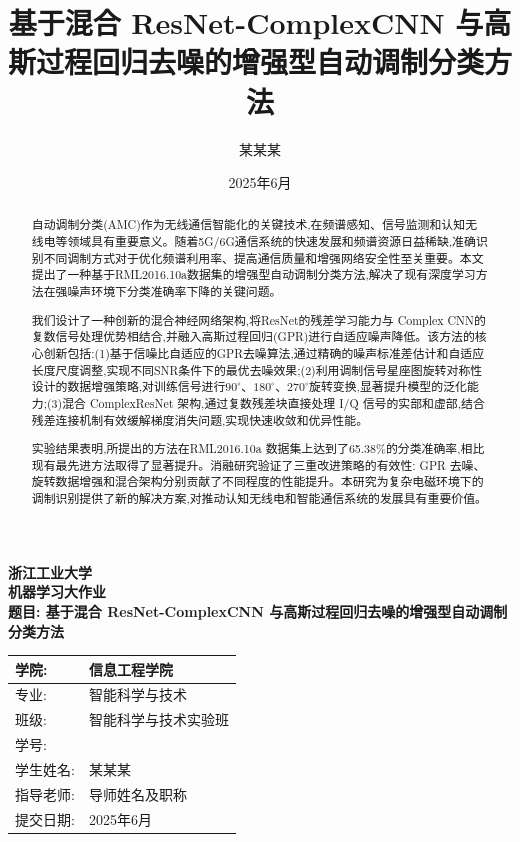 \documentclass{article}
\title{基于混合 ResNet-ComplexCNN 与高斯过程回归去噪的增强型自动调制分类方法}
\author{某某某}
\date{2025年6月}
\begin{document}
\begin{CJK}{UTF8}{gbsn}

\maketitle

\begin{center}
    \textbf{浙江工业大学} \\
    \textbf{机器学习大作业} \\
    \textbf{题目: 基于混合 ResNet-ComplexCNN 与高斯过程回归去噪的增强型自动调制分类方法} \\
    \vspace{0.5cm}
    \begin{tabular}{|l|l|}
        \hline
        学院: & 信息工程学院 \\
        \hline
        专业: & 智能科学与技术 \\
        \hline
        班级: & 智能科学与技术实验班 \\
        \hline
        学号: & \\
        \hline
        学生姓名: & 某某某 \\
        \hline
        指导老师: & 导师姓名及职称 \\
        \hline
        提交日期: & 2025年6月 \\
        \hline
    \end{tabular}
\end{center}

\newpage
\begin{abstract}
自动调制分类(AMC)作为无线通信智能化的关键技术,在频谱感知、信号监测和认知无线电等领域具有重要意义。随着5G/6G通信系统的快速发展和频谱资源日益稀缺,准确识别不同调制方式对于优化频谱利用率、提高通信质量和增强网络安全性至关重要。本文提出了一种基于RML2016.10a数据集的增强型自动调制分类方法,解决了现有深度学习方法在强噪声环境下分类准确率下降的关键问题。

我们设计了一种创新的混合神经网络架构,将ResNet的残差学习能力与 Complex CNN的复数信号处理优势相结合,并融入高斯过程回归(GPR)进行自适应噪声降低。该方法的核心创新包括:(1)基于信噪比自适应的GPR去噪算法,通过精确的噪声标准差估计和自适应长度尺度调整,实现不同SNR条件下的最优去噪效果;(2)利用调制信号星座图旋转对称性设计的数据增强策略,对训练信号进行$90^{\circ}$、$180^{\circ}$、$270^{\circ}$旋转变换,显著提升模型的泛化能力;(3)混合 ComplexResNet 架构,通过复数残差块直接处理 I/Q 信号的实部和虚部,结合残差连接机制有效缓解梯度消失问题,实现快速收敛和优异性能。

实验结果表明,所提出的方法在RML2016.10a 数据集上达到了65.38\%的分类准确率,相比现有最先进方法取得了显著提升。消融研究验证了三重改进策略的有效性: GPR 去噪、旋转数据增强和混合架构分别贡献了不同程度的性能提升。本研究为复杂电磁环境下的调制识别提供了新的解决方案,对推动认知无线电和智能通信系统的发展具有重要价值。


\end{abstract}
\end{CJK}
\end{document}
